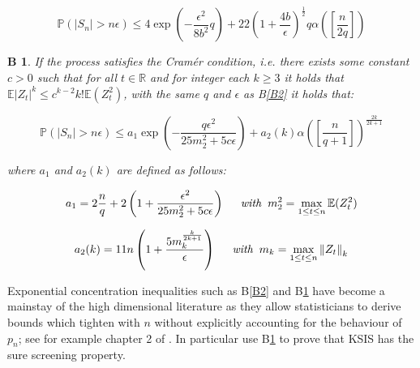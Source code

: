 \documentclass[11pt]{report}\usepackage[utf8]{inputenc}
\newtheorem{bound}{B}
\begin{document}
\begin{equation*}
    \mathbb{P}\left ( \left | S_n \right | > n \epsilon \right ) \leq 4 \exp\left ( -\frac{\epsilon^2}{8b^2} q \right ) + 22\left ( 1+\frac{4b}{\epsilon} \right )^{\frac{1}{2}}q\alpha\left ( \left [ \frac{n}{2q} \right ] \right )
\end{equation*}

\begin{bound} \label{B3}
    If the process satisfies the Cramér condition, i.e. there exists some constant $c>0$ such that for all $t \in \mathbb{R}$ and for integer each $k \geq 3$ it holds that $\mathbb{E}\left | Z_t \right |^k\leq c^{k-2} k! \mathbb{E}\left ( Z_t^2 \right )$, with the same $q$ and $\epsilon$ as B\ref{B2} it holds that: 
\end{bound}

\begin{equation*}
    \mathbb{P}\left ( \left | S_n \right | > n \epsilon \right ) \leq a_1 \exp\left ( -\frac{q\epsilon^2}{25m_2^2+5c\epsilon} \right )+a_2(k)\alpha\left ( \left [ \frac{n}{q+1} \right ] \right )^\frac{2k}{2k+1}
\end{equation*}

\textit{where $a_1$ and $a_2(k)$ are defined as follows:} 

\begin{equation*}
    a_1 = 2\frac{n}{q}+2\left ( 1+\frac{\epsilon^2}{25m_2^2 + 5c \epsilon} \right ) \hspace{0.5cm} \textit{with} \hspace{0.2cm} m_2^2 = \max_{1\leq t\leq n} \mathbb{E}(Z^2_t)
\end{equation*}

\begin{equation*}
    a_2(k) = 11n\left ( 1 + \frac{5m_k^{\frac{k}{2k+1}}}{\epsilon} \right ) \hspace{0.5cm} \textit{with} \hspace{0.2cm} m_k = \max_{1\leq t\leq n} \left \| Z_t \right \|_k
\end{equation*}

Exponential concentration inequalities such as B\ref{B2} and B\ref{B3} have become a mainstay of the high dimensional literature as they allow statisticians to derive bounds which tighten with $n$ without explicitly accounting for the behaviour of $p_n$; see for example chapter 2 of \cite{wainwright2019high}. In particular \cite{chen2018semiparametric} use B\ref{B3} to prove that KSIS has the sure screening property. 
\end{document}
